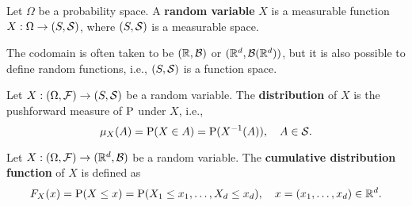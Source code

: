 \begin{definition}
    Let $\Omega$ be a probability space. A \textbf{random variable} 
    $X$ is a measurable function $X:\Omega\to (S,\S)$, where $(S,\S)$ 
    is a measurable space.
\end{definition}
\begin{remark}
    The codomain is often taken to be $(\R,\B)$ or $(\R^d,\B(\R^d))$, 
    but it is also possible to define random functions, i.e., 
    $(S,\S)$ is a function space. 
\end{remark}

\begin{definition}
    Let $X:(\Omega,\F)\to (S,\S)$ be a random variable. The \textbf{distribution} 
    of $X$ is the pushforward measure of $\P$ under $X$, i.e., 
    \begin{equation*}
        \mu_X(A) = \P(X\in A) = \P(X^{-1}(A)),\quad A\in\S.
    \end{equation*} 
\end{definition}

\begin{definition}
    Let $X:(\Omega,\F)\to (\R^d,\B)$ be a random variable. The 
    \textbf{cumulative distribution function} of $X$ is defined as 
    \begin{equation*}
        F_X(x) = \P(X\leq x) = \P(X_1\leq x_1,\ldots,X_d\leq x_d),\quad x=(x_1,\ldots,x_d)\in\R^d.
    \end{equation*} 
\end{definition}

